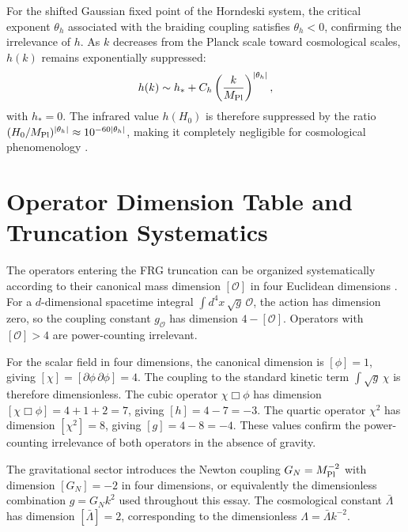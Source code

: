 \documentclass[12pt,a4paper]{article}
\begin{document}
For the shifted Gaussian fixed point of the Horndeski system, the critical
exponent $\theta_h$ associated with the braiding coupling satisfies
$\theta_h < 0$, confirming the irrelevance of $h$. As $k$ decreases from the
Planck scale toward cosmological scales, $h(k)$ remains exponentially
suppressed:
\begin{equation}
h(k) \sim h_* + C_h \left(\frac{k}{M_{\rm Pl}}\right)^{|\theta_h|},
\end{equation}
with $h_* = 0$. The infrared value $h(H_0)$ is therefore suppressed by the
ratio $(H_0/M_{\rm Pl})^{|\theta_h|} \approx 10^{-60|\theta_h|}$, making it
completely negligible for cosmological phenomenology \cite{EichhornLinoWagner2023}.

\section{Operator Dimension Table and Truncation Systematics}
\label{app:dimensions}

The operators entering the FRG truncation can be organized systematically
according to their canonical mass dimension $[{\mathcal O}]$ in four Euclidean
dimensions \cite{WilsonKogut1974,Peskin1995}. For a $d$-dimensional spacetime
integral $\int d^4x\,\sqrt{g}\,\mathcal{O}$, the action has dimension zero,
so the coupling constant $g_{\mathcal O}$ has dimension $4 - [\mathcal{O}]$.
Operators with $[\mathcal{O}] > 4$ are power-counting irrelevant.

For the scalar field in four dimensions, the canonical dimension is
$[\phi] = 1$, giving $[\chi] = [\partial\phi\,\partial\phi] = 4$. The coupling
to the standard kinetic term $\int\sqrt{g}\,\chi$ is therefore dimensionless.
The cubic operator $\chi\Box\phi$ has dimension $[\chi\Box\phi] = 4 + 1 + 2 = 7$,
giving $[h] = 4 - 7 = -3$. The quartic operator $\chi^2$ has dimension
$[\chi^2] = 8$, giving $[g] = 4 - 8 = -4$. These values confirm the
power-counting irrelevance of both operators in the absence of gravity.

The gravitational sector introduces the Newton coupling $G_N = M_{\rm Pl}^{-2}$
with dimension $[G_N] = -2$ in four dimensions, or equivalently the
dimensionless combination $g = G_N k^2$ used throughout this essay. The
cosmological constant $\bar\Lambda$ has dimension $[\bar\Lambda] = 2$,
corresponding to the dimensionless $\Lambda = \bar\Lambda k^{-2}$.
\end{document}
